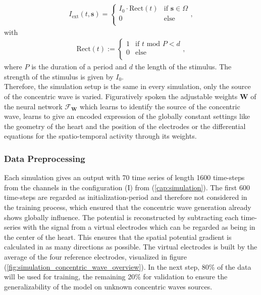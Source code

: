 \begin{align}
    I_{\text{ext}}(t, \textbf{s})=
    \begin{cases}
        I_0\cdot\text{Rect}(t) & \mbox{if } \textbf{s}\in\Omega \\
        0 & \mbox{else}\\
    \end{cases},
\end{align}
with
\begin{align}
    \text{Rect}(t):=
    \begin{cases}
        1 & \mbox{if } t\text{ mod }P < d \\
        0 & \mbox{else}\\
    \end{cases},
\end{align}
where $P$ is the duration of a period and $d$ the length of the stimulus. The strength of the stimulus is given by $I_0$.\\

Therefore, the simulation setup is the same in every simulation, only the source of the concentric wave is varied. Figuratively spoken the adjustable weights $\textbf{W}$ of the neural network $\mathcal{F}_{\textbf{W}}$ which learns to identify the source of the concentric wave, learns to give an encoded expression of the globally constant settings like the geometry of the heart and the position of the electrodes or the differential equations for the spatio-temporal activity through its weights.

\subsubsection{Data Preprocessing}
Each simulation gives an output with 70 time series of length 1600 time-steps from the channels in the configuration (I) from (\ref{cap:simulation}). The first 600 time-steps are regarded as initialization-period and therefore not considered in the training process, which ensured that the concentric wave generation already shows globally influence. The potential is reconstructed by subtracting each time-series with the signal from a virtual electrodes which can be regarded as being in the center of the heart. This ensures that the spatial potential gradient is calculated in as many directions as possible. The virtual electrodes is built by the average of the four reference electrodes, visualized in figure (\ref{fig:simulation_concentric_wave_overview}).
In the next step, 80\% of the data will be used for training, the remaining 20\% for validation to ensure the generalizability of the model on unknown concentric waves sources.

